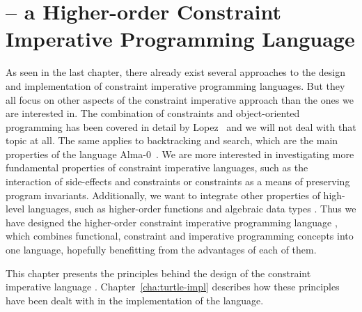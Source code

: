 

\newcommand{\lsq}{{\normalfont [\![}}
\newcommand{\rsq}{{\normalfont ]\!]}}
\newcommand{\ST}[1]{{\mathcal{S}\lsq #1 \rsq}}
\newcommand{\TT}[1]{{\mathcal{T}\lsq #1 \rsq}}
\newcommand{\ET}[1]{{\mathcal{E}\lsq #1 \rsq}}

\chapter[\turtle{} -- a Constraint Imperative Language]%
{\turtle{} -- a Higher-order Constraint Imperative Programming Language}
\label{cha:turtle}

As seen in the last chapter, there already exist several approaches to
the design and implementation of constraint imperative programming
languages.  But they all focus on other aspects of the constraint
imperative approach than the ones we are interested in.  The
combination of constraints and object-oriented programming has been
covered in detail by Lopez~\cite{lopez97phd} and we will not deal with
that topic at all.  The same applies to backtracking and search, which
are the main properties of the language Alma-0~\cite{apt97search,
  apt98alma, apt98almaproject}.  We are more interested in
investigating more fundamental properties of constraint imperative
languages, such as the interaction of side-effects and constraints or
constraints as a means of preserving program invariants. Additionally,
we want to integrate other properties of high-level languages, such as
higher-order functions and algebraic
data types%
.  Thus we have designed the
higher-order constraint imperative programming language \turtle{},
which combines functional, constraint and imperative programming
concepts into one language, hopefully benefitting from the advantages
of each of them.

This chapter presents the principles behind the design of the
constraint imperative language \turtle{}.
Chapter~\ref{cha:turtle-impl} describes how these principles have been
dealt with in the implementation of the language.


